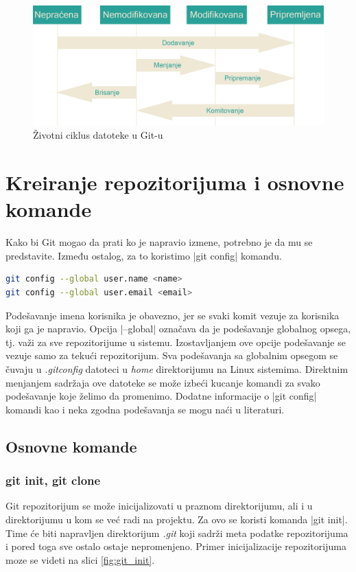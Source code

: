 \documentclass[a4paper]{article}
\begin{document}
{\begin{figure}[h!]
\begin{center}
\includegraphics[scale=0.18]{images/lifecycle2.png}
\end{center}
\caption{Životni ciklus datoteke u Git-u}
\label{fig:git_lifecycle}
\end{figure}


\section{Kreiranje repozitorijuma i osnovne komande}
\label{sec:kreiranje}

Kako bi Git mogao da prati ko je napravio izmene, potrebno je da mu se predstavite. Između ostalog, za to koristimo  |git config| komandu.

\begin{lstlisting}[language=bash]
git config --global user.name <name>
git config --global user.email <email>
\end{lstlisting}

\noindent
Podešavanje imena korisnika je obavezno, jer se svaki komit vezuje za korisnika koji ga je napravio. Opcija |--global| označava da je podešavanje globalnog opsega, tj. važi za sve repozitorijume u sistemu. Izostavljanjem ove opcije podešavanje se vezuje samo za tekući repozitorijum. Sva podešavanja sa globalnim opsegom se čuvaju u \textit{.gitconfig} datoteci u \textit{home} direktorijumu na Linux sistemima. Direktnim menjanjem sadržaja ove datoteke se može izbeći kucanje komandi za svako podešavanje koje želimo da promenimo. Dodatne informacije o |git config| komandi kao i neka zgodna podešavanja se mogu naći u literaturi.

\subsection{Osnovne komande}
\label{osnovne_komande}

\subsubsection*{git init, git clone}
\label{subsec:git_init}
Git repozitorijum se može inicijalizovati u praznom direktorijumu, ali i u direktorijumu u kom se već radi na projektu. Za ovo se koristi komanda |git init|. Time će biti napravljen direktorijum \textit{.git} koji sadrži meta podatke repozitorijuma i pored toga sve ostalo ostaje nepromenjeno. Primer inicijalizacije repozitorijuma moze se videti na slici \ref{fig:git_init}.

}
\end{document}
